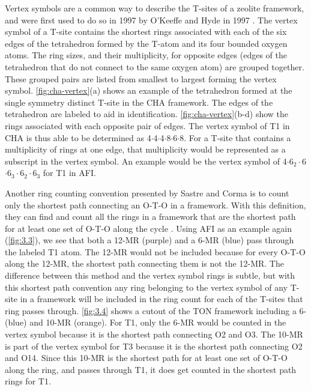 \documentclass[preprint,numrefs,noinfo,sort&compress]{elsarticle}
\begin{document}
Vertex symbols are a common way to describe the T-sites of a zeolite framework, and were first used to do so in 1997 by O'Keeffe and Hyde in 1997 \cite{okeeffe-vertex-1997}. The vertex symbol of a T-site contains the shortest rings associated with each of the six edges of the tetrahedron formed by the T-atom and its four bounded oxygen atoms. The ring sizes, and  their multiplicity, for opposite edges (edges of the tetrahedron that do not connect to the same oxygen atom) are grouped together. These grouped pairs are listed from smallest to largest forming the vertex symbol. \cref{fig:cha-vertex}(a) shows an example of the tetrahedron formed at the single symmetry distinct T-site in the CHA framework. The edges of the tetrahedron are labeled to aid in identification. \cref{fig:cha-vertex}(b-d) show the rings associated with each opposite pair of edges. The vertex symbol of T1 in CHA is thus able to be determined as 4\(\cdot\)4\(\cdot\)4\(\cdot\)8\(\cdot\)6\(\cdot\)8. For a T-site that contains a multiplicity of rings at one edge, that multiplicity would be represented as a subscript in the vertex symbol. An example would be the vertex symbol of 4\(\cdot\)6\(_{\text{2}} \cdot\)6\(\cdot\)6\(_{\text{3}} \cdot\)6\(_{\text{2}} \cdot\)6\(_{\text{3}}\) for T1 in AFI. 

Another ring counting convention presented by Sastre and Corma is to count only the shortest path connecting an O-T-O in a framework. With this definition, they can find and count all the rings in a framework that are the shortest path for at least one set of O-T-O along the cycle \cite{sastre-topological-2009}. Using AFI as an example again (\cref{fig:3.3}), we see that both a 12-MR (purple) and a 6-MR (blue) pass through the labeled T1 atom. The 12-MR would not be included because for every O-T-O along the 12-MR, the shortest path connecting them is not the 12-MR. The difference between this method and the vertex symbol rings is subtle, but with this shortest path convention any ring belonging to the vertex symbol of any T-site in a framework will be included in the ring count for each of the T-sites that ring passes through. \cref{fig:3.4} shows a cutout of the TON framework including a 6- (blue) and 10-MR (orange). For T1, only the 6-MR would be counted in the vertex symbol because it is the shortest path connecting O2 and O3. The 10-MR is part of the vertex symbol for T3 because it is the shortest path connecting O2 and O14. Since this 10-MR is the shortest path for at least one set of O-T-O along the ring, and passes through T1, it does get counted in the shortest path rings for T1. 
\end{document}
